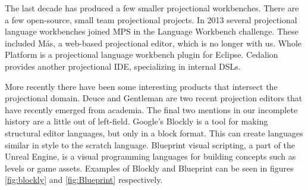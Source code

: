 The last decade has produced a few smaller projectional workbenches.
There are a few open-source, small team projectional projects.
In 2013 several projectional language workbenches joined MPS in the Language Workbench challenge\cite{erdweg2015evaluating}.
These included M\'as, a web-based projectional editor, which is no longer with us\cite{MasPostMortem}.
Whole Platform\cite{WholePlatformProductPage} is a projectional language workbench plugin for Eclipse.
Cedalion\cite{lorenz2011cedalion} provides another projectional IDE, specializing in internal DSLs.

More recently there have been some interesting products that intersect the projectional domain.
Deuce\cite{hempel2018deuce} and Gentleman\cite{lafontant2020gentleman_SLR} are two recent projection editors that have recently emerged from academia.
The final two mentions in our incomplete history are a little out of left-field. 
Google's Blockly\cite{Blockly_ProductPage} is a tool for making structural editor languages, but only in a block format.
This can create languages similar in style to the scratch language. 
Blueprint visual scripting, a part of the Unreal Engine, is a visual programming languages for building concepts such as levels or game assets.
Examples of Blockly and Blueprint can be seen in figures \ref{fig:blockly} and \ref{fig:Blueprint} respectively.


